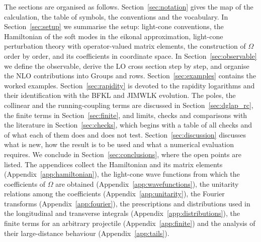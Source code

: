 The sections are organised as follows. Section~\ref{sec:notation} gives the map of the calculation, the table of symbols, the conventions and the vocabulary. In Section~\ref{sec:setup} we summarise the setup: light-cone conventions, the Hamiltonian of the soft modes in the eikonal approximation, light-cone perturbation theory with operator-valued matrix elements, the construction of $\Omega$ order by order, and its coefficients in coordinate space. In Section~\ref{sec:observable} we define the observable, derive the LO cross section step by step, and organise the NLO contributions into Groups and rows. Section~\ref{sec:examples} contains the worked examples. Section~\ref{sec:rapidity} is devoted to the rapidity logarithms and their identification with the BFKL and JIMWLK evolution. The poles, the collinear and the running-coupling terms are discussed in Section~\ref{sec:dglap_rc}, the finite terms in Section~\ref{sec:finite}, and limits, checks and comparisons with the literature in Section~\ref{sec:checks}, which begins with a table of all checks and of what each of them does and does not test. Section~\ref{sec:discussion} discusses what is new, how the result is to be used and what a numerical evaluation requires. We conclude in Section~\ref{sec:conclusions}, where the open points are listed. The appendices collect the Hamiltonian and its matrix elements (Appendix~\ref{app:hamiltonian}), the light-cone wave functions from which the coefficients of $\Omega$ are obtained (Appendix~\ref{app:wavefunctions}), the unitarity relations among the coefficients (Appendix~\ref{app:unitarity}), the Fourier transforms (Appendix~\ref{app:fourier}), the prescriptions and distributions used in the longitudinal and transverse integrals (Appendix~\ref{app:distributions}), the finite terms for an arbitrary projectile (Appendix~\ref{app:finite}) and the analysis of their large-distance behaviour (Appendix~\ref{app:tails}).

